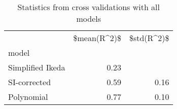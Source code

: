 
\begin{table}[H]
    \centering
    \caption{Statistics from cross validations with all models}
   \begin{tabular}{lrr}
\toprule
{} &  \$mean(R\textasciicircum 2)\$ &  \$std(R\textasciicircum 2)\$ \\
model            &              &             \\
\midrule
Simplified Ikeda &         0.23 &             \\
SI-corrected     &         0.59 &        0.16 \\
Polynomial       &         0.77 &        0.10 \\
\bottomrule
\end{tabular}

    \label{tab:crossvalidation}
\end{table}
    